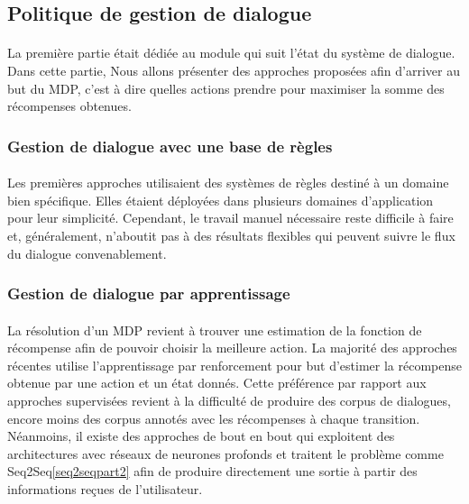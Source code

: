 	\subsection{Politique de gestion de dialogue}
		\paragraph{}
		La première partie était dédiée au module qui suit l’état du système de dialogue. Dans cette partie, Nous allons présenter des approches proposées afin d’arriver au but du MDP, c’est à dire quelles actions prendre pour maximiser la somme des récompenses obtenues.
		\subsubsection{Gestion de dialogue avec une base de règles}
		\paragraph{}
		Les premières approches utilisaient des systèmes de règles destiné à un domaine bien spécifique. Elles étaient déployées dans plusieurs domaines d’application pour leur simplicité. Cependant, le travail manuel nécessaire reste difficile à faire et, généralement, n’aboutit pas à des résultats flexibles qui peuvent suivre le flux du dialogue convenablement\cite{Lee2010}.
	\subsubsection{Gestion de dialogue par apprentissage}
		\paragraph{}
		La résolution d’un MDP revient à trouver une estimation de la fonction de récompense afin de pouvoir choisir la meilleure action. La majorité des approches récentes utilise l’apprentissage par renforcement pour but d’estimer la récompense obtenue par une action et un état donnés. Cette préférence par rapport aux approches supervisées revient à la difficulté de produire des corpus de dialogues\cite{Henderson2008}, encore moins des corpus annotés avec les récompenses à chaque transition. Néanmoins, il existe des approches de bout en bout qui exploitent des architectures avec réseaux de neurones profonds et traitent le problème comme Seq2Seq\ref{seq2seqpart2} afin de produire directement une sortie à partir des informations reçues de l’utilisateur\cite{Wen2017,Serban2016}.


